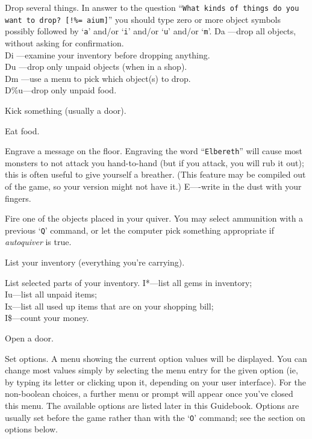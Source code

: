 \item[\tb{{\rm D}}]
Drop several things.  In answer to the question
``{\tt What kinds of things do you want to drop? [!\%= aium]}''
you should type zero or more object symbols possibly followed by 
`{\tt a}' and/or `{\tt i}' and/or `{\tt u}' and/or `{\tt m}'.
Da ---drop all objects, without asking for confirmation.\\
Di ---examine your inventory before dropping anything.\\
Du ---drop only unpaid objects (when in a shop).\\
Dm ---use a menu to pick which object(s) to drop.\\
D\%u---drop only unpaid food.

\item[\tb{\^{}{\rm D}}]
Kick something (usually a door).

\item[\tb{{\rm e}}]
Eat food.

\item[\tb{{\rm E}}]
Engrave a message on the floor.
Engraving the word ``{\tt Elbereth}'' will cause most monsters to not attack
you hand-to-hand (but if you attack, you will rub it out); this is
often useful to give yourself a breather.  (This feature may be compiled out
of the game, so your version might not have it.)
E----write in the dust with your fingers.  

\item[\tb{{\rm f}}]
Fire one of the objects placed in your quiver.  You may select
ammunition with a previous `{\tt Q}' command, or let the computer pick
something appropriate if
{\it autoquiver\/} 
is true.

\item[\tb{{\rm i}}]
List your inventory (everything you're carrying).

\item[\tb{{\rm I}}]
List selected parts of your inventory.
I*---list all gems in inventory;\\
Iu---list all unpaid items;\\
Ix---list all used up items that are on your shopping bill;\\
I\$---count your money.

\item[\tb{{\rm o}}]
Open a door.

\item[\tb{{\rm O}}]
Set options.  A menu showing the current option values will be
displayed.  You can change most values simply by selecting the menu
entry for the given option (ie, by typing its letter or clicking upon
it, depending on your user interface).  For the non-boolean choices,
a further menu or prompt will appear once you've closed this menu.
The available options
are listed later in this Guidebook.  Options are usually set before the
game rather than with the `{\tt O}' command; see the section on options below.

